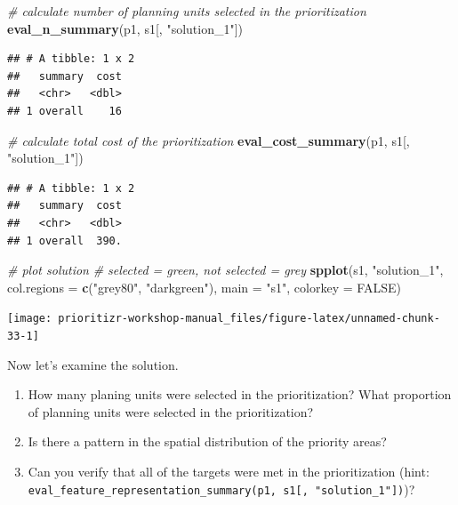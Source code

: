 \documentclass[
  12pt,
]{book}
\makeatletter
\newenvironment{Shaded}{\begin{snugshade}}{\end{snugshade}}
\newcommand{\CommentTok}[1]{\textcolor[rgb]{0.56,0.35,0.01}{\textit{#1}}}
\newcommand{\DataTypeTok}[1]{\textcolor[rgb]{0.13,0.29,0.53}{#1}}
\newcommand{\KeywordTok}[1]{\textcolor[rgb]{0.13,0.29,0.53}{\textbf{#1}}}
\newcommand{\NormalTok}[1]{#1}
\newcommand{\OtherTok}[1]{\textcolor[rgb]{0.56,0.35,0.01}{#1}}
\newcommand{\StringTok}[1]{\textcolor[rgb]{0.31,0.60,0.02}{#1}}
\providecommand{\tightlist}{%
  \setlength{\itemsep}{0pt}\setlength{\parskip}{0pt}}
\newenvironment{kframe}{%
\medskip{}
\setlength{\fboxsep}{.8em}
 \def\at@end@of@kframe{}%
 \ifinner\ifhmode%
  \def\at@end@of@kframe{\end{minipage}}%
  \begin{minipage}{\columnwidth}%
 \fi\fi%
 \def\FrameCommand##1{\hskip\@totalleftmargin \hskip-\fboxsep
 \colorbox{shadecolor}{##1}\hskip-\fboxsep
     \hskip-\linewidth \hskip-\@totalleftmargin \hskip\columnwidth}%
 \MakeFramed {\advance\hsize-\width
   \@totalleftmargin\z@ \linewidth\hsize
   \@setminipage}}%
 {\par\unskip\endMakeFramed%
 \at@end@of@kframe}
\newenvironment{rmdblock}[1]
  {
  \begin{itemize}
  \renewcommand{\labelitemi}{
    \raisebox{-.7\height}[0pt][0pt]{
      {\setkeys{Gin}{width=3em,keepaspectratio}\texttt{[image: images/\#1]}}
    }
  }
  \setlength{\fboxsep}{1em}
  \begin{kframe}
  \item
  }
  {
  \end{kframe}
  \end{itemize}
  }
\newenvironment{rmdquestion}
  {\begin{rmdblock}{question}}
  {\end{rmdblock}}
\makeatother
\begin{document}
\begin{Shaded}
\begin{Highlighting}[]
\CommentTok{# calculate number of planning units selected in the prioritization}
\KeywordTok{eval_n_summary}\NormalTok{(p1, s1[, }\StringTok{"solution_1"}\NormalTok{])}
\end{Highlighting}
\end{Shaded}

\begin{verbatim}
## # A tibble: 1 x 2
##   summary  cost
##   <chr>   <dbl>
## 1 overall    16
\end{verbatim}

\begin{Shaded}
\begin{Highlighting}[]
\CommentTok{# calculate total cost of the prioritization}
\KeywordTok{eval_cost_summary}\NormalTok{(p1, s1[, }\StringTok{"solution_1"}\NormalTok{])}
\end{Highlighting}
\end{Shaded}

\begin{verbatim}
## # A tibble: 1 x 2
##   summary  cost
##   <chr>   <dbl>
## 1 overall  390.
\end{verbatim}

\begin{Shaded}
\begin{Highlighting}[]
\CommentTok{# plot solution}
\CommentTok{# selected = green, not selected = grey}
\KeywordTok{spplot}\NormalTok{(s1, }\StringTok{"solution_1"}\NormalTok{, }\DataTypeTok{col.regions =} \KeywordTok{c}\NormalTok{(}\StringTok{"grey80"}\NormalTok{, }\StringTok{"darkgreen"}\NormalTok{), }\DataTypeTok{main =} \StringTok{"s1"}\NormalTok{,}
       \DataTypeTok{colorkey =} \OtherTok{FALSE}\NormalTok{)}
\end{Highlighting}
\end{Shaded}

\begin{center}\texttt{[image: prioritizr-workshop-manual\_files/figure-latex/unnamed-chunk-33-1]} \end{center}

Now let's examine the solution.

\begin{rmdquestion}
\begin{enumerate}
\def\labelenumi{\arabic{enumi}.}
\tightlist
\item
  How many planing units were selected in the prioritization? What proportion of planning units were selected in the prioritization?
\item
  Is there a pattern in the spatial distribution of the priority areas?
\item
  Can you verify that all of the targets were met in the prioritization (hint: \texttt{eval\_feature\_representation\_summary(p1,\ s1{[},\ "solution\_1"{]})})?
\end{enumerate}
\end{rmdquestion}
\end{document}
